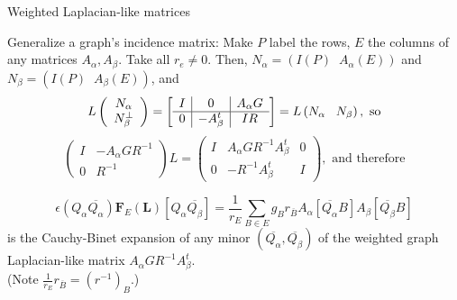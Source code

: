 \documentclass{beamer}
\newcommand{\ext}[1]{\ensuremath{\mathbf{#1}}}
\begin{document}
\begin{frame}{Weighted Laplacian-like matrices}

  Generalize a graph's incidence matrix: Make $P$ label the rows,
  $E$ the columns of any matrices $A_\alpha,A_\beta$.  Take all $r_e\neq 0$.
  Then,
  $N_\alpha = ( I(P)\;\; A_\alpha(E))$ and $N_\beta= (I(P)\;\; A_\beta(E))$, and
  \vspace{-0.1in}
   \[
    L\left( \begin{array}{c} N_{\alpha}\\ N_{\beta}^{\perp} \end{array} \right)
    = \left[\begin{array}{c|c|c} I  &  0  &  A_\alpha  G \\  \hline
0  & -A_\beta^t  &  IR \end{array}\right] = L\left( N_{\alpha}\;\;\; N_\beta \right), \text{\ so}
    \]
    \vspace{-0.1in}
    \[
    \left(\begin{array}{cc} I & -A_\alpha  G R^{-1} \\
      0 & R^{-1} \end{array} \right) L
    = \left(\begin{array}{ccc}
        I & A_\alpha GR^{-1}A_\beta^t& 0 \\
        0 & -R^{-1}A_\beta ^t    & I
        \end{array} \right), \text{\ and therefore}
    \]

    \[
    \epsilon(Q_\alpha\overline{Q_\alpha})\ext{F}_E(\ext{L})[Q_\alpha \overline{Q_\beta}] =
       \frac{1}{r_E} \sum_{B\in E}g_B r_{\overline{B}} A_\alpha[\overline{Q_\alpha} B] A_\beta[{\overline{Q_\beta}}B]  
    \]
    is the Cauchy-Binet expansion of any  minor $(\overline{Q_\alpha},\overline{Q_\beta})$ of the
    weighted graph Laplacian-like matrix $A_\alpha GR^{-1}A_\beta^t$.\\
    (Note $\frac{1}{r_E}r_{\overline B}=(r^{-1})_B$.)
\end{frame}
\end{document}
